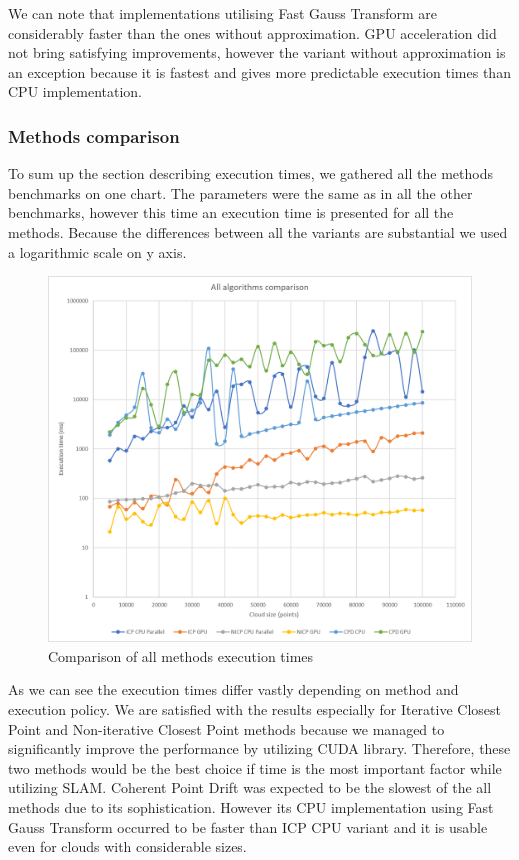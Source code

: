 \documentclass[titlepage]{article}
\begin{document}
We can note that implementations utilising Fast Gauss Transform are considerably faster than the ones without approximation. GPU acceleration did not bring satisfying improvements, however the variant without approximation is an exception because it is fastest and gives more predictable execution times than CPU implementation.

\subsubsection{Methods comparison}

To sum up the section describing execution times, we gathered all the methods benchmarks on one chart. The parameters were the same as in all the other benchmarks, however this time an execution time is presented for all the methods. Because the differences between all the variants are substantial we used a logarithmic scale on y axis.

\begin{figure}[H]
\includegraphics[width=\textwidth]{ms-all.png}
\caption{Comparison of all methods execution times}
\end{figure}

As we can see the execution times differ vastly depending on method and execution policy. We are satisfied with the results especially for Iterative Closest Point and Non-iterative Closest Point methods because we managed to significantly improve the performance by utilizing CUDA library. Therefore, these two methods would be the best choice if time is the most important factor while utilizing SLAM. Coherent Point Drift was expected to be the slowest of the all methods due to its sophistication. However its CPU implementation using Fast Gauss Transform occurred to be faster than ICP CPU variant and it is usable even for clouds with considerable sizes.
\end{document}
